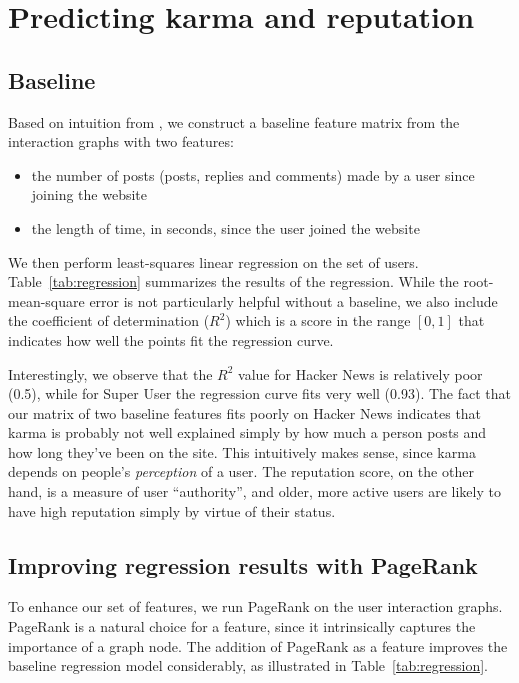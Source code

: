 \documentclass[10pt]{article}
\begin{document}
\section{Predicting karma and reputation}
\label{sec:prediction}

\subsection{Baseline}

Based on intuition from \citet{movshovitzanalysis}, we construct a baseline
feature matrix from the interaction graphs with two features:
\begin{itemize}
  \item the number of posts (posts, replies and comments) made by a user since
    joining the website
  \item the length of time, in seconds, since the user joined the website
\end{itemize}

We then perform least-squares linear regression on the set of users.
Table~\ref{tab:regression} summarizes the results of the regression. While the
root-mean-square error is not particularly helpful without a baseline, we also
include the coefficient of determination ($R^2$) which is a score in the range
$[0, 1]$ that indicates how well the points fit the regression curve.

Interestingly, we observe that the $R^2$ value for Hacker News is relatively
poor (0.5), while for Super User the regression curve fits very well (0.93). The
fact that our matrix of two baseline features fits poorly on Hacker News
indicates that karma is probably not well explained simply by how much a person
posts and how long they've been on the site. This intuitively makes sense, since
karma depends on people's \emph{perception} of a user. The reputation score, on
the other hand, is a measure of user ``authority'', and older, more active users
are likely to have high reputation simply by virtue of their status.

\subsection{Improving regression results with PageRank}
\label{sec:baseline-and-pagerank}

To enhance our set of features, we run PageRank on the user interaction graphs.
PageRank is a natural choice for a feature, since it intrinsically captures the
importance of a graph node. The addition of PageRank as a feature improves the
baseline regression model considerably, as illustrated in
Table~\ref{tab:regression}.
\end{document}
